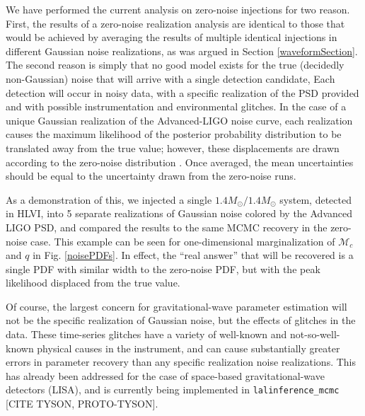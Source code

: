 \documentclass[11pt,a4paper]{emulateapj}
\newcommand{\carl}[1]{{\color{red}  #1}}
\newcommand{\chmass}{\mathcal{M}_c}
\begin{document}
  

We have performed the current analysis on zero-noise injections for two reason.  First, the results of a zero-noise realization
analysis are identical to those that would be achieved by averaging the results of multiple identical injections 
in different Gaussian noise realizations, as was argued in Section \ref{waveformSection}.  The second reason is simply
that no good model exists for the true (decidedly non-Gaussian) noise that will arrive with a single detection candidate,
Each detection will occur in noisy data, with a specific realization of the PSD provided and with 
possible instrumentation and environmental glitches.  In the case of a unique Gaussian realization
of the Advanced-LIGO noise curve, each realization causes the maximum likelihood of the posterior probability 
distribution to be translated away from the true value; however, these displacements are drawn
according to the zero-noise distribution \citep{Inadequacies}.  Once averaged, the mean
uncertainties should be equal to the uncertainty drawn from the zero-noise runs.  

As a demonstration of this, we injected a single $1.4M_{\odot}/1.4M_{\odot}$ system, 
detected in HLVI,  into 5 separate realizations of Gaussian noise colored by the Advanced LIGO PSD, 
and compared the results to the same MCMC recovery in the zero-noise case.  This example
can be seen for one-dimensional marginalization of $\chmass$ and $q$ in Fig. \ref{noisePDFs}.  In effect, the ``real answer'' that will be recovered is a single PDF with similar 
width to the zero-noise PDF, but with the peak likelihood displaced from the true value.  

Of course, the largest concern for gravitational-wave parameter estimation will not be the specific
realization of Gaussian noise, but the effects of glitches in the data.  These time-series 
glitches have a variety of well-known and not-so-well-known physical causes in the instrument,
and can cause substantially greater errors in parameter recovery than any specific realization noise realizations.  This has already been addressed for the case of space-based gravitational-wave
detectors (LISA), and is currently being implemented in \texttt{lalinference\_mcmc} 
\carl{[CITE TYSON, PROTO-TYSON]}.
\end{document}
